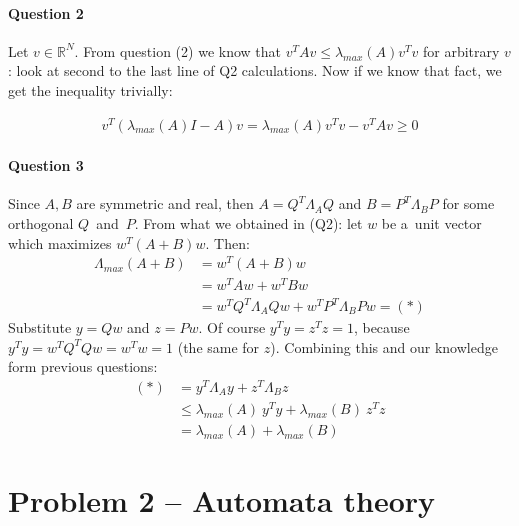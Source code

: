 \paragraph{Question 2}
 Let $v\in\mathbb{R}^N$.
From question (2) we know that $v^T A v\leq \lambda_{max}(A) v^T v$ for arbitrary $v$: look at second to the last line of Q2 calculations.
Now if we know that fact, we get the inequality trivially:

\begin{align*}
    v^T(\lambda_{max}(A) I - A) v 
        = \lambda_{max}(A) v^T v - v^T A v
        \geq 0
\end{align*}


\paragraph{Question 3}
Since $A, B$ are symmetric and real, then $A = Q^T\Lambda_A Q$ and $B = P^T\Lambda_B P$ for some orthogonal $Q$~and~$P$.
From what we obtained in (Q2): let $w$ be a~unit vector which maximizes $w^T(A+B)w$.
Then:
\begin{align*}
    \Lambda_{max}(A+B) &= w^T(A+B)w \\
                        &= w^T A w + w^T B w \\
                        &= w^T Q^T \Lambda_A Q w + w^T P^T \Lambda_B P w = (*)
\end{align*} 
Substitute $y = Qw$ and $z = Pw$. Of course $y^T y = z^T z = 1$, because $y^T y = w^TQ^TQw = w^T w = 1$ (the same for $z$).
Combining this and our knowledge form previous questions:
\begin{align*}
    (*) &= y^T \Lambda_A y + z^T \Lambda_B z \\
            &\leq \lambda_{max}(A) \: y^T y + \lambda_{max}(B) \: z^T z \\
            &= \lambda_{max}(A) + \lambda_{max}(B)
\end{align*}


\section{Problem 2 – Automata theory}
